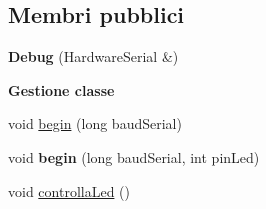 \subsection*{Membri pubblici}
\begin{DoxyCompactItemize}
\item 
\mbox{\label{class_debug_ad98adb03156e1c1b34a4668e4191efad}} 
{\bfseries Debug} (Hardware\+Serial \&)
\end{DoxyCompactItemize}
\begin{Indent}\textbf{ Gestione classe}\par
\begin{DoxyCompactItemize}
\item 
void \hyperlink{class_debug_a8ae9111a766ef45d390a87bdabdc8b23}{begin} (long baud\+Serial)
\item 
\mbox{\label{class_debug_a78023cabf228def947898ee5fd8dd3bb}} 
void {\bfseries begin} (long baud\+Serial, int pin\+Led)
\item 
void \hyperlink{class_debug_a63cf78c0389f81d066418c1c25d2d21d}{controlla\+Led} ()
\end{DoxyCompactItemize}
\end{Indent}

